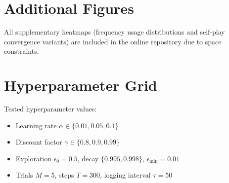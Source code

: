 \documentclass[conference]{IEEEtran}
\begin{document}
\appendix
\section{Additional Figures}
All supplementary heatmaps (frequency usage distributions and self-play convergence variants) are included in the online repository due to space constraints.

\section{Hyperparameter Grid}
Tested hyperparameter values:
\begin{itemize}
  \item Learning rate $\alpha \in \{0.01,0.05,0.1\}$
  \item Discount factor $\gamma \in \{0.8,0.9,0.99\}$
  \item Exploration $\epsilon_{0}=0.5$, decay $\{0.995,0.998\}$, $\epsilon_{\min}=0.01$
  \item Trials $M=5$, steps $T=300$, logging interval $\tau=50$
\end{itemize}



\end{document}
